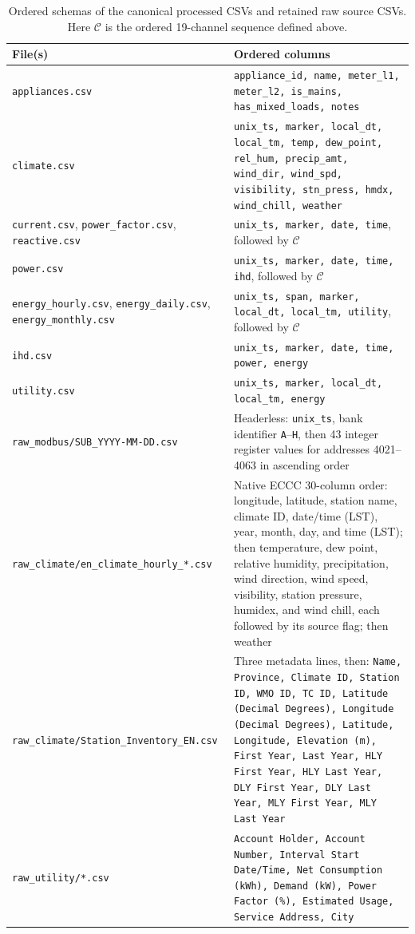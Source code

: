 \documentclass{IEEEoj-data}
\begin{document}
\begin{table}[t]
\centering
\caption{Ordered schemas of the canonical processed CSVs and retained raw source CSVs. Here $\mathcal{C}$ is the ordered 19-channel sequence defined above.}
\label{tab:schemas}
\scriptsize
\begin{tabularx}{\textwidth}{lY}
\toprule
File(s) & Ordered columns \\
\midrule
\texttt{appliances.csv} & \texttt{appliance\_id, name, meter\_l1, meter\_l2, is\_mains, has\_mixed\_loads, notes} \\
\texttt{climate.csv} & \texttt{unix\_ts, marker, local\_dt, local\_tm, temp, dew\_point, rel\_hum, precip\_amt, wind\_dir, wind\_spd, visibility, stn\_press, hmdx, wind\_chill, weather} \\
\texttt{current.csv}, \texttt{power\_factor.csv}, \texttt{reactive.csv} & \texttt{unix\_ts, marker, date, time}, followed by $\mathcal{C}$ \\
\texttt{power.csv} & \texttt{unix\_ts, marker, date, time, ihd}, followed by $\mathcal{C}$ \\
\texttt{energy\_hourly.csv}, \texttt{energy\_daily.csv}, \texttt{energy\_monthly.csv} & \texttt{unix\_ts, span, marker, local\_dt, local\_tm, utility}, followed by $\mathcal{C}$ \\
\texttt{ihd.csv} & \texttt{unix\_ts, marker, date, time, power, energy} \\
\texttt{utility.csv} & \texttt{unix\_ts, marker, local\_dt, local\_tm, energy} \\
\texttt{raw\_modbus/SUB\_YYYY-MM-DD.csv} & Headerless: \texttt{unix\_ts}, bank identifier \texttt{A}--\texttt{H}, then 43 integer register values for addresses 4021--4063 in ascending order \\
\texttt{raw\_climate/en\_climate\_hourly\_*.csv} & Native ECCC 30-column order: longitude, latitude, station name, climate ID, date/time (LST), year, month, day, and time (LST); then temperature, dew point, relative humidity, precipitation, wind direction, wind speed, visibility, station pressure, humidex, and wind chill, each followed by its source flag; then weather \\
\texttt{raw\_climate/Station\_Inventory\_EN.csv} & Three metadata lines, then: \texttt{Name, Province, Climate ID, Station ID, WMO ID, TC ID, Latitude (Decimal Degrees), Longitude (Decimal Degrees), Latitude, Longitude, Elevation (m), First Year, Last Year, HLY First Year, HLY Last Year, DLY First Year, DLY Last Year, MLY First Year, MLY Last Year} \\
\texttt{raw\_utility/*.csv} & \texttt{Account Holder, Account Number, Interval Start Date/Time, Net Consumption (kWh), Demand (kW), Power Factor (\%), Estimated Usage, Service Address, City} \\
\bottomrule
\end{tabularx}
\end{table}
\end{document}
